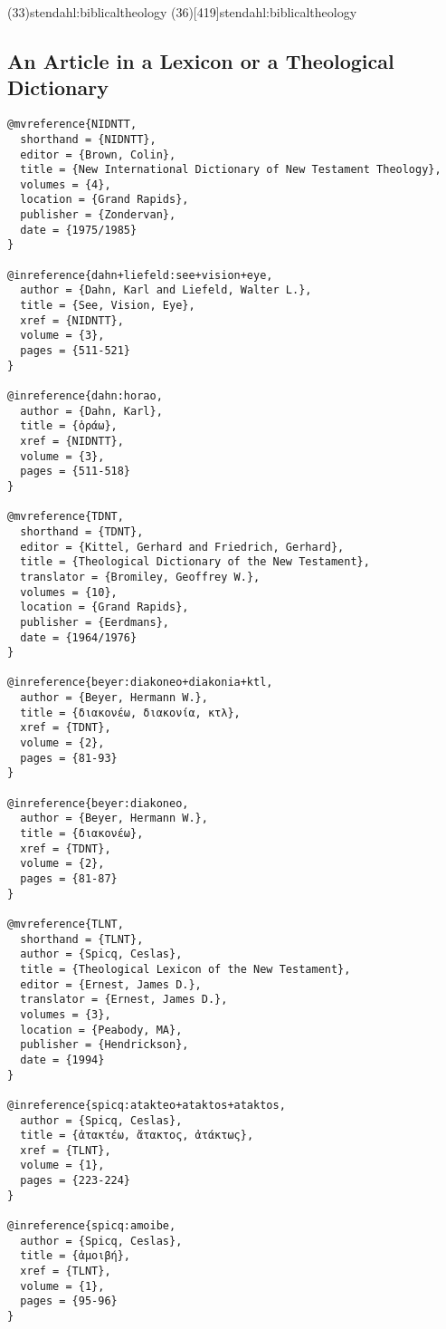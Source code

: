 \documentclass[a4paper]{article}
\begin{document}
\examplecite(33){stendahl:biblicaltheology}
\examplecite(36)[419]{stendahl:biblicaltheology}
\exampleabbreviations
\examplebibliography

\subsection{An Article in a Lexicon or a Theological Dictionary}

\begin{verbatim}
@mvreference{NIDNTT,
  shorthand = {NIDNTT},
  editor = {Brown, Colin},
  title = {New International Dictionary of New Testament Theology},
  volumes = {4},
  location = {Grand Rapids},
  publisher = {Zondervan},
  date = {1975/1985}
}

@inreference{dahn+liefeld:see+vision+eye,
  author = {Dahn, Karl and Liefeld, Walter L.},
  title = {See, Vision, Eye},
  xref = {NIDNTT},
  volume = {3},
  pages = {511-521}
}

@inreference{dahn:horao,
  author = {Dahn, Karl},
  title = {ὁράω},
  xref = {NIDNTT},
  volume = {3},
  pages = {511-518}
}

@mvreference{TDNT,
  shorthand = {TDNT},
  editor = {Kittel, Gerhard and Friedrich, Gerhard},
  title = {Theological Dictionary of the New Testament},
  translator = {Bromiley, Geoffrey W.},
  volumes = {10},
  location = {Grand Rapids},
  publisher = {Eerdmans},
  date = {1964/1976}
}

@inreference{beyer:diakoneo+diakonia+ktl,
  author = {Beyer, Hermann W.},
  title = {διακονέω, διακονία, κτλ},
  xref = {TDNT},
  volume = {2},
  pages = {81-93}
}

@inreference{beyer:diakoneo,
  author = {Beyer, Hermann W.},
  title = {διακονέω},
  xref = {TDNT},
  volume = {2},
  pages = {81-87}
}

@mvreference{TLNT,
  shorthand = {TLNT},
  author = {Spicq, Ceslas},
  title = {Theological Lexicon of the New Testament},
  editor = {Ernest, James D.},
  translator = {Ernest, James D.},
  volumes = {3},
  location = {Peabody, MA},
  publisher = {Hendrickson},
  date = {1994}
}

@inreference{spicq:atakteo+ataktos+ataktos,
  author = {Spicq, Ceslas},
  title = {ἀτακτέω, ἄτακτος, ἀτάκτως},
  xref = {TLNT},
  volume = {1},
  pages = {223-224}
}

@inreference{spicq:amoibe,
  author = {Spicq, Ceslas},
  title = {ἀμοιβή},
  xref = {TLNT},
  volume = {1},
  pages = {95-96}
}
\end{verbatim}
\end{document}
